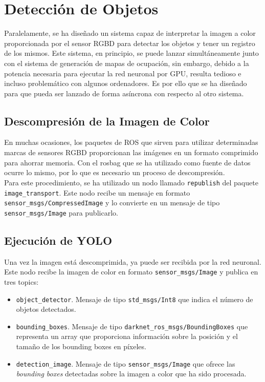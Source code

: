 \section{Detección de Objetos}

Paralelamente, se ha diseñado un sistema capaz de interpretar la imagen a color proporcionada por el sensor RGBD para detectar los objetos y tener un registro de los mismos. Este sistema, en principio, se puede lanzar simultáneamente junto con el sistema de generación de mapas de ocupación, sin embargo, debido a la potencia necesaria para ejecutar la red neuronal por GPU, resulta tedioso e incluso problemático con algunos ordenadores. Es por ello que se ha diseñado para que pueda ser lanzado de forma asíncrona con respecto al otro sistema.\\

\subsection{Descompresión de la Imagen de Color}

En muchas ocasiones, los paquetes de ROS que sirven para utilizar determinadas marcas de sensores RGBD proporcionan las imágenes en un formato comprimido para ahorrar memoria. Con el rosbag que se ha utilizado como fuente de datos ocurre lo mismo, por lo que es necesario un proceso de descompresión.\\

Para este procedimiento, se ha utilizado un nodo llamado \texttt{republish} del paquete \texttt{image\_transport}. Este nodo recibe un mensaje en formato \texttt{sensor\_msgs/\-Compressed\-Image} y lo convierte en un mensaje de tipo \texttt{sensor\_msgs/Image} para publicarlo.\\

\subsection{Ejecución de YOLO}

Una vez la imagen está descomprimida, ya puede ser recibida por la red neuronal. Este nodo recibe la imagen de color en formato \texttt{sensor\_msgs/Image} y publica en tres topics:

\begin{itemize}

	\item \texttt{object\_detector}. Mensaje de tipo \texttt{std\_msgs/Int8} que indica el número de objetos detectados.
	\item \texttt{bounding\_boxes}. Mensaje de tipo \texttt{darknet\_ros\_msgs/BoundingBoxes} que representa un array que proporciona información sobre la posición y el tamaño de los bounding boxes en píxeles.
	\item \texttt{detection\_image}. Mensaje de tipo \texttt{sensor\_msgs/Image} que ofrece las \textit{bounding boxes} detectadas sobre la imagen a color que ha sido procesada.
	
\end{itemize}

